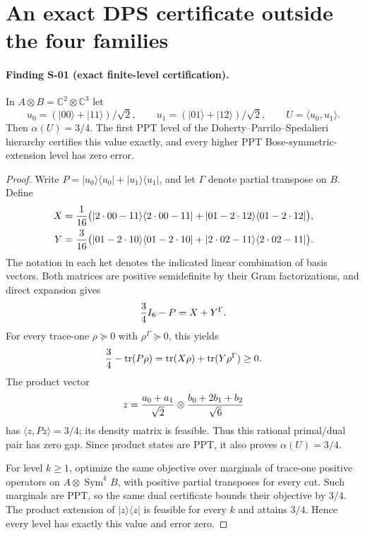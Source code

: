 \section{An exact DPS certificate outside the four families}
\label{sec:dps-example}

\paragraph{Finding S-01 (exact finite-level certification).}
In $A\otimes B=\mathbb C^2\otimes\mathbb C^3$ let
\[
 u_0=(|00\rangle+|11\rangle)/\sqrt2,\qquad
 u_1=(|01\rangle+|12\rangle)/\sqrt2,\qquad U=\langle u_0,u_1\rangle.
\]
Then $\alpha(U)=3/4$. The first PPT level of the
Doherty--Parrilo--Spedalieri hierarchy certifies this value exactly,
and every higher PPT Bose-symmetric-extension level has zero error.

\begin{proof}
Write $P=|u_0\rangle\langle u_0|+|u_1\rangle\langle u_1|$,
and let $\Gamma$ denote partial transpose on $B$. Define
\begin{align*}
 X={1\over16}\bigl(&|2\cdot00-11\rangle\langle2\cdot00-11|
       +|01-2\cdot12\rangle\langle01-2\cdot12|\bigr),\\
 Y={3\over16}\bigl(&|01-2\cdot10\rangle\langle01-2\cdot10|
       +|2\cdot02-11\rangle\langle2\cdot02-11|\bigr).
\end{align*}
The notation in each ket denotes the indicated linear combination of
basis vectors. Both matrices are positive semidefinite by their Gram
factorizations, and direct expansion gives
\begin{equation}\label{eq:dps-exact-witness}
 {3\over4}I_6-P=X+Y^\Gamma.
\end{equation}
For every trace-one $\rho\succeq0$ with $\rho^\Gamma\succeq0$, this yields
\[
 {3\over4}-\operatorname{tr}(P\rho)
 =\operatorname{tr}(X\rho)+\operatorname{tr}(Y\rho^\Gamma)\geq0.
\]
The product vector
\[
 z={a_0+a_1\over\sqrt2}\otimes{b_0+2b_1+b_2\over\sqrt6}
\]
has $\langle z,Pz\rangle=3/4$; its density matrix is feasible. Thus
this rational primal/dual pair has zero gap. Since product states
are PPT, it also proves $\alpha(U)=3/4$.

For level $k\geq1$, optimize the same objective over marginals of
trace-one positive operators on $A\otimes\operatorname{Sym}^k B$,
with positive partial transposes for every cut. Such marginals are
PPT, so the same dual certificate bounds their objective by $3/4$.
The product extension of $|z\rangle\langle z|$ is feasible for
every $k$ and attains $3/4$. Hence every level has exactly this
value and error zero.
\end{proof}


